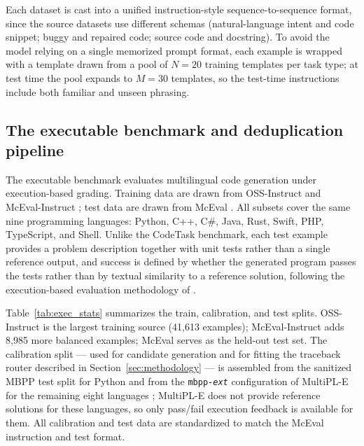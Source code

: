 Each dataset is cast into a unified instruction-style sequence-to-sequence format, since the source datasets use different schemas (natural-language intent and code snippet; buggy and repaired code; source code and docstring). To avoid the model relying on a single memorized prompt format, each example is wrapped with a template drawn from a pool of $N=20$ training templates per task type; at test time the pool expands to $M=30$ templates, so the test-time instructions include both familiar and unseen phrasing.

\subsection{The executable benchmark and deduplication pipeline}
\label{sec:exec_data}

The executable benchmark evaluates multilingual code generation under execution-based grading. Training data are drawn from OSS-Instruct \citep{wei2023magicoder} and McEval-Instruct \citep{chai2024mceval}; test data are drawn from McEval \citep{chai2024mceval}. All subsets cover the same nine programming languages: Python, C++, C\#, Java, Rust, Swift, PHP, TypeScript, and Shell. Unlike the CodeTask benchmark, each test example provides a problem description together with unit tests rather than a single reference output, and success is defined by whether the generated program passes the tests rather than by textual similarity to a reference solution, following the execution-based evaluation methodology of \citet{chen2021evaluating}.

Table~\ref{tab:exec_stats} summarizes the train, calibration, and test splits. OSS-Instruct is the largest training source (41,613 examples); McEval-Instruct adds 8,985 more balanced examples; McEval serves as the held-out test set. The calibration split --- used for candidate generation and for fitting the traceback router described in Section~\ref{sec:methodology} --- is assembled from the sanitized MBPP test split for Python \citep{austin2021program} and from the \texttt{mbpp-\textit{ext}} configuration of MultiPL-E for the remaining eight languages \citep{cassano2023multipl}; MultiPL-E does not provide reference solutions for these languages, so only pass/fail execution feedback is available for them. All calibration and test data are standardized to match the McEval instruction and test format.

\begin{table}[t]
\centering
\caption{Statistics of the executable benchmark subsets.}
\label{tab:exec_stats}
\scriptsize
{}
\end{table}

